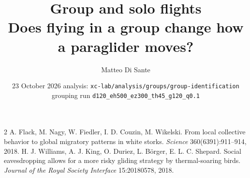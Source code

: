 \documentclass[10pt,a4paper]{article}
\title{\textbf{Group and solo flights}\\[2pt]
  \large Does flying in a group change how a paraglider moves?}
\author{Matteo Di Sante}
\date{23 October 2026 \;\textbullet\; analysis: \texttt{xc-lab/analysis/groups/group-identification} \;\textbullet\;
  grouping run \texttt{d120\_eh500\_ez300\_th45\_g120\_q0.1}}
\begin{document}
\maketitle













\begin{thebibliography}{2}\small
{} A. Flack, M. Nagy, W. Fiedler, I. D. Couzin, M. Wikelski. From local collective
behavior to global migratory patterns in white storks. \emph{Science} 360(6391):911--914, 2018.
 H. J. Williams, A. J. King, O. Duriez, L. Börger, E. L. C. Shepard. Social
eavesdropping allows for a more risky gliding strategy by thermal-soaring birds. \emph{Journal of
the Royal Society Interface} 15:20180578, 2018.
\end{thebibliography}

\clearpage
\appendix

\end{document}
